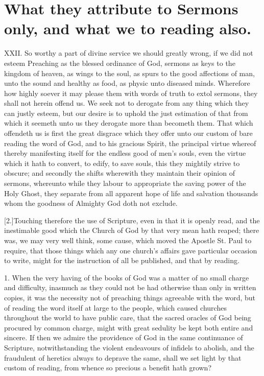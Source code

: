 \section*{What they attribute to Sermons only, and what we to reading also.}
XXII. So worthy a part of divine service we should greatly wrong, if we did not esteem Preaching as the blessed ordinance of God, sermons as keys to the kingdom of heaven, as wings to the soul, as spurs to the good affections of man, unto the sound and healthy as food, as physic unto diseased minds. Wherefore how highly soever it may please them with words of truth to extol sermons, they shall not herein offend us. We seek not to derogate from any thing which they can justly esteem, but our desire is to uphold the just estimation of that from which it seemeth unto us they derogate more than becometh them. That which offendeth us is first the great disgrace which they offer unto our custom of bare reading the word of God, and to his gracious Spirit, the principal virtue whereof thereby manifesting itself for the endless good of men’s souls, even the virtue which it hath to convert, to edify, to save souls, this they mightily strive to obscure; and secondly the shifts wherewith they maintain their opinion of sermons, whereunto while they labour to appropriate the saving power of the Holy Ghost, they separate from all apparent hope of life and salvation thousands whom the goodness of Almighty God doth not exclude.

[2.]Touching therefore the use of Scripture, even in that it is openly read, and the inestimable good which the Church of God by that very mean hath reaped; there was, we may very well think, some cause, which moved the Apostle St. Paul to require, that those things which any one church’s  affairs gave particular occasion to write, might for the instruction of all be published, and that by reading.

1. When the very having of the books of God was a matter of no small charge and difficulty, inasmuch as they could not be had otherwise than only in written copies, it was the necessity not of preaching things agreeable with the word, but of reading the word itself at large to the people, which caused churches throughout the world to have public care, that the sacred oracles of God being procured by common charge, might with great sedulity be kept both entire and sincere. If then we admire the providence of God in the same continuance of Scripture, notwithstanding the violent endeavours of infidels to abolish, and the fraudulent of heretics always to deprave the same, shall we set light by that custom of reading, from whence so precious a benefit hath grown?

